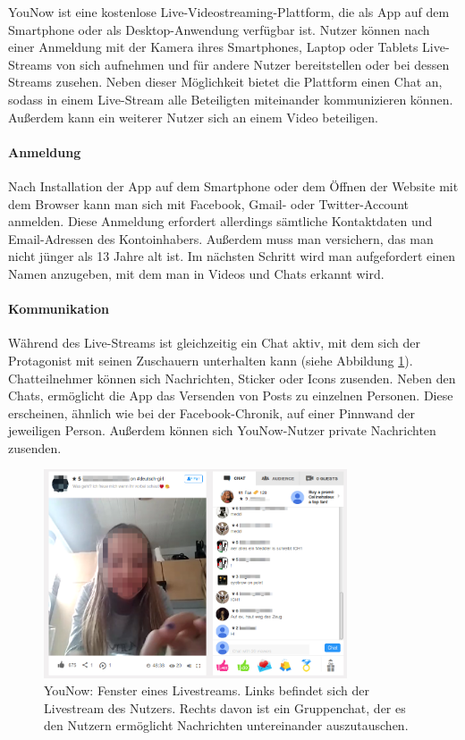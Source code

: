 YouNow ist eine kostenlose Live-Videostreaming-Plattform, die als App auf dem
Smartphone oder als Desktop-Anwendung verfügbar ist. Nutzer können nach einer
Anmeldung mit der Kamera ihres Smartphones, Laptop oder Tablets Live-Streams
von sich aufnehmen und für andere Nutzer bereitstellen oder bei dessen Streams
zusehen. Neben dieser Möglichkeit bietet die Plattform einen Chat an, sodass in
einem Live-Stream alle Beteiligten miteinander kommunizieren können. Außerdem
kann ein weiterer Nutzer sich an einem Video beteiligen.

\paragraph{Anmeldung}
Nach Installation der App auf dem Smartphone oder dem Öffnen der Website mit dem Browser kann man sich mit Facebook, Gmail- oder Twitter-Account anmelden. Diese Anmeldung erfordert allerdings sämtliche Kontaktdaten und Email-Adressen des Kontoinhabers. Außerdem muss man versichern, das man nicht jünger als 13 Jahre alt ist.
Im nächsten Schritt wird man aufgefordert einen Namen anzugeben, mit dem man in Videos und Chats erkannt wird.

\paragraph{Kommunikation}
Während des Live-Streams ist gleichzeitig ein Chat aktiv, mit dem sich der Protagonist mit seinen Zuschauern unterhalten kann (siehe Abbildung \ref{stream_with_chat}). Chatteilnehmer können sich Nachrichten, Sticker oder Icons zusenden. Neben den Chats, ermöglicht die App das Versenden von Posts zu einzelnen Personen. Diese erscheinen, ähnlich wie bei der Facebook-Chronik, auf einer Pinnwand der jeweiligen Person. Außerdem können sich YouNow-Nutzer private Nachrichten zusenden.

\begin{figure}[!ht]
\centering
\includegraphics[width=0.8\textwidth]{./resources/younow_stream_with_chat}
\caption{YouNow: Fenster eines Livestreams. Links befindet sich der Livestream des Nutzers. Rechts davon ist ein Gruppenchat, der es den Nutzern erm\"oglicht Nachrichten untereinander auszutauschen.}
\label{stream_with_chat}
\end{figure} 

